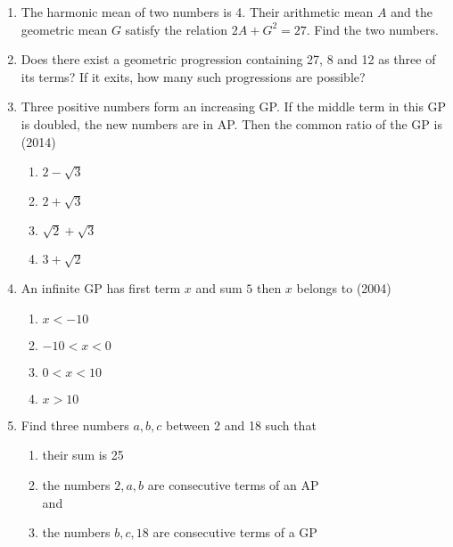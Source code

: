 \begin{enumerate}[label=\thesubsection.\arabic*,ref=\thesubsection.\theenumi]
\begin{multicols}{4}
\begin{enumerate}
            \item $a=3, r=1/4$
            \end{enumerate}
            \end{multicols}
    \item The harmonic mean of two numbers is 4. Their arithmetic mean $A$ and the geometric mean $G$ satisfy the relation
    $2A + G^2 = 27$.
    Find the two numbers.  \hfill{}
    \item Does there exist a geometric progression containing 27,  8 and 12 as three of its terms? If it exits,  how many such progressions are possible?  \hfill{}
    \item Three positive numbers form an increasing GP. If the middle term in this GP is doubled,  the new numbers are in AP. Then the common ratio of the GP is 
%    
    \hfill(2014)
    \begin{multicols}{4}
\begin{enumerate}    
    \item$2-\sqrt{3}$
    \item$2+\sqrt{3}$
    \item$\sqrt{2}+\sqrt{3}$
    \item$3+\sqrt{2}$ 
    \end{enumerate}
\end{multicols}
%
\item An infinite GP has first term $x$ and sum $5$ then $x$ belongs to \hfill(2004)
            \begin{multicols}{4}
\begin{enumerate}    
                \item $x<-10$
                \item $-10<x<0$
                \item $0<x<10$
                \item $x>10$
                \end{enumerate}
                \end{multicols}
    \item Find three numbers $a, b, c$ between 2 and 18 such that
\begin{enumerate}    
    \item their sum is 25
    \item the numbers $2, a, b$ are consecutive terms of an AP
    \\
    and
    \item the numbers $b, c, 18$ are consecutive terms of a GP\hfill{}
    \end{enumerate}
%  
\end{enumerate}
